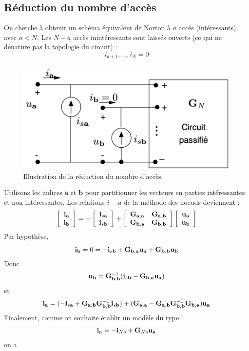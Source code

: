 \subsection{Réduction du nombre d'accès}
On cherche à obtenir un schéma équivalent de Norton à $a$ accès (intéressants), avec $a<N$.
Les $N-a$ accès inintéressants sont laissés ouverts (ce qui ne dénature pas la topologie du circuit) : 
\[i_{a+1},\ldots,i_N=0\]
\begin{figure}[htb]
\centering
\includegraphics[width=0.7\linewidth]{figs/methodes-generales/reduction}
\caption{Illustration de la réduction du nombre d'accès.}
\label{fig:reduction}
\end{figure}
Utilisons les indices $\mathbf{a}$ et $\mathbf{b}$ pour partitionner les vecteurs en parties intéressantes et non-intéressantes. Les relations $i-u$ de la méthode des noeuds deviennent : 
{
\[\left[
\begin{array}{c}
{\bf i}_{\bf a}\\
{\bf i}_{\bf b}
\end{array}\right]=
- \left[
\begin{array}{c}
{\bf i}_{s{\bf a}}\\
{\bf i}_{s{\bf b}}
\end{array}\right] + 
\left[
\begin{array}{cc}
{\bf G}_{\bf a,a}& {\bf G}_{\bf a,b}\\
{\bf G}_{\bf b,a}& {\bf G}_{\bf b,b}
\end{array}\right]
\left[
\begin{array}{c}
{\bf u}_{\bf a}\\
{\bf u}_{\bf b}
\end{array}\right]\]
Par hypothèse, 
\[
{\bf i}_{\bf b}=0 =-{\bf i}_{s{\bf b}}+{\bf G}_{\bf b,a}{\bf u}_{\bf a}+{\bf
	G}_{\bf b,b}{\bf u}_{\bf b}\]
Donc 
\[{\bf u}_{\bf b}={\bf G}_{\bf b,b}^{-1}({\bf i}_{s{\bf b}}-{\bf G}_{\bf	b,a}{\bf u}_{\bf a})\]
et 
\[{\bf i}_{\bf a}=(-{\bf i}_{s{\bf a}}+{\bf G}_{\bf a,b}{\bf G}_{\bf b,b}^{-1}{\bf
	i}_{s{\bf b}})
+({\bf G}_{\bf a,a}-{\bf G}_{\bf a,b}{\bf G}_{\bf b,b}^{-1}{\bf
	G}_{\bf b,a}){\bf
	u}_{\bf a}\]
Finalement, comme on souhaite établir un modèle du type 
\[ {\bf i}_{\bf a}=-{\bf i}_{No}+{\bf G}_{No}{\bf u}_{\bf a}\]}
on a 

